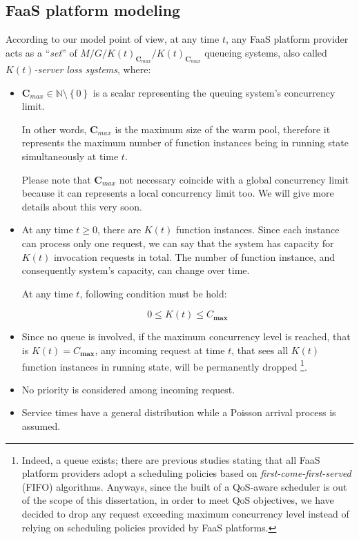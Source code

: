 \documentclass[12pt,a4paper]{report}
\newcommand{\N}{\mathbb{N}}
\begin{document}
\subsection{FaaS platform modeling}

According to our model point of view, at any time $t$, any FaaS platform provider acts as a ``\textit{set}'' of $M/G/K(t)_{\textbf{C}_{max}}/K(t)_{\textbf{C}_{max}}$ queueing systems, also called \textit{$K(t)$-server loss systems}, where:

\begin{itemize}
	
	\item $\textbf{C}_{max} \in \N \setminus \left\{0\right\}$ is a scalar representing the queuing system's concurrency limit.
	
	In other words, $\textbf{C}_{max}$ is the maximum size of the warm pool, therefore it represents the maximum number of function instances being in running state simultaneously at time $t$. 
	
	Please note that $\textbf{C}_{max}$ not necessary coincide with a global concurrency limit because it can represents a local concurrency limit too. We will give more details about this very soon.
	
	\item At any time $t \geq 0$, there are $K(t)$ function instances. Since each instance can process only one request, we can say that the system has capacity for $K(t)$ invocation requests in total. The number of function instance, and consequently system's capacity, can change over time. 
	
	At any time $t$, following condition must be hold:
	
	\begin{equation}
		0 \leq K(t) \leq {C}_{\textbf{max}}
	\end{equation}
	
	\item Since no queue is involved, if the maximum concurrency level is reached, that is $K(t) = {C}_{\textbf{max}}$, any incoming request at time $t$, that sees all $K(t)$ function instances in running state, will be permanently dropped \footnote{Indeed, a queue exists; there are previous studies stating that all FaaS platform providers adopt a scheduling policies based on \textit{first-come-first-served} (FIFO) algorithms. Anyways, since the built of a QoS-aware scheduler is out of the scope of this dissertation, in order to meet QoS objectives, we have decided to drop any request exceeding maximum concurrency level instead of relying on scheduling policies provided by FaaS platforms.}.
	
	\item No priority is considered among incoming request.
	
	\item Service times have a general distribution while a Poisson arrival process is assumed.
\end{itemize} 
\end{document}
